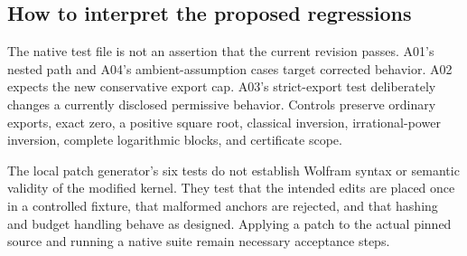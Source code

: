 \subsection{How to interpret the proposed regressions}
The native test file is not an assertion that the current revision passes. A01's nested path and A04's ambient-assumption cases target corrected behavior. A02 expects the new conservative export cap. A03's strict-export test deliberately changes a currently disclosed permissive behavior. Controls preserve ordinary exports, exact zero, a positive square root, classical inversion, irrational-power inversion, complete logarithmic blocks, and certificate scope.

The local patch generator's six tests do not establish Wolfram syntax or semantic validity of the modified kernel. They test that the intended edits are placed once in a controlled fixture, that malformed anchors are rejected, and that hashing and budget handling behave as designed. Applying a patch to the actual pinned source and running a native suite remain necessary acceptance steps.
